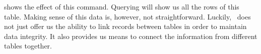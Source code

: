  shows the effect of this command.
Querying  will show us all the rows of this table.
Making sense of this data is, however, not straightforward.
Luckily, \sql\ does not just offer us the ability to link records between tables in order to maintain data integrity.
It also provides us means to connect the information from different tables together.%
%
\endhsection%
\FloatBarrier%
\endhsection%
\endhsection%
%
